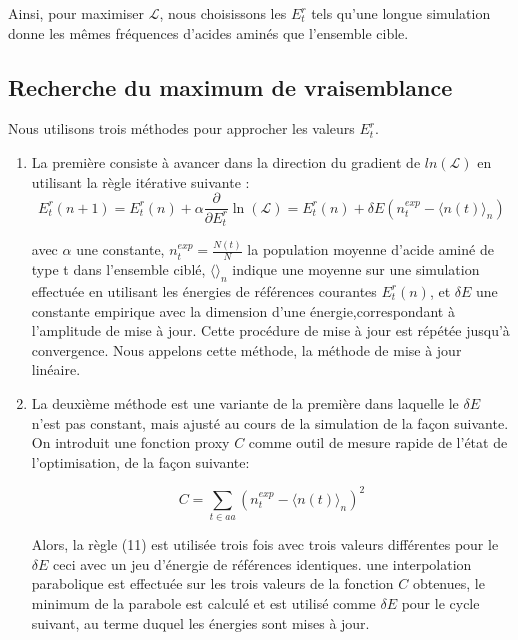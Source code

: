 Ainsi, pour maximiser $\mathcal{L}$, nous choisissons les ${E^r_t}$ tels qu'une longue simulation donne les mêmes fréquences d'acides aminés que l'ensemble cible.


\subsection{Recherche du maximum de vraisemblance}


Nous utilisons trois méthodes pour approcher les valeurs ${E^r_t}$.

\begin{enumerate}
  \label{enumMeth}
\item La première consiste à avancer dans la direction du gradient de $ln(\mathcal{L})$ en utilisant la règle itérative suivante \cite{Kleinman06}:
\begin{equation} \label {eq: linear}
  E^r_t(n+1) = E^r_t(n) + \alpha \frac{\partial}{\partial E^r_t} \ln(\mathcal{L})=E^r_t(n) + \delta E (n^{exp}_t - \langle n(t)\rangle_n)
\end{equation} 

avec $\alpha$ une constante, $n^{exp}_t = \frac{N(t)}{N}$ la population moyenne d'acide aminé de type t dans l'ensemble ciblé,
$\langle\rangle_n$ indique une moyenne sur une simulation effectuée en utilisant les énergies de références courantes ${E^r_t(n)}$, et $\delta E$ une constante empirique avec la dimension d'une énergie,correspondant à l'amplitude de mise à jour. Cette procédure de mise à jour est répétée jusqu'à convergence. Nous appelons cette méthode, la méthode de mise à jour linéaire.

\item La deuxième méthode est une variante de la première dans laquelle le $\delta E$ n'est pas constant, mais ajusté au cours de la simulation de la façon suivante. On introduit une fonction proxy $C$ comme outil de mesure rapide de l'état de l'optimisation, de la façon suivante:

\begin{equation} \label {eq:proxy_function}
C =\sum_{t \in aa}(n^{exp}_t - \langle n(t)\rangle_n )^2
\end{equation} 

  Alors, la règle (11) est utilisée trois fois avec trois valeurs différentes pour le $\delta E$ ceci avec un jeu d'énergie de références identiques. une interpolation parabolique est effectuée sur les trois valeurs de la fonction $C$ obtenues, le minimum de la parabole est calculé et est utilisé comme $\delta E$ pour le cycle suivant, au terme duquel les énergies sont mises à jour.


\end{enumerate}
